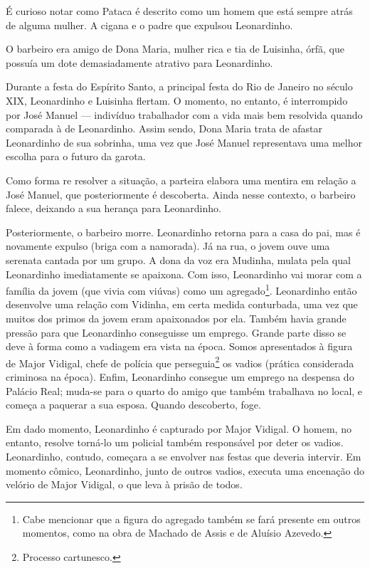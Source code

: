 É curioso notar como Pataca é descrito como um homem que está sempre atrás de alguma mulher. A cigana e o padre que expulsou Leonardinho.

O barbeiro era amigo de Dona Maria, mulher rica e tia de Luisinha, órfã, que possuía um dote demasiadamente atrativo para Leonardinho.

Durante a festa do Espírito Santo, a principal festa do Rio de Janeiro no século XIX, Leonardinho e Luisinha flertam. O momento, no entanto, é interrompido por José Manuel — indivíduo trabalhador com a vida mais bem resolvida quando comparada à de Leonardinho. Assim sendo, Dona Maria trata de afastar Leonardinho de sua sobrinha, uma vez que José Manuel representava uma melhor escolha para o futuro da garota.

Como forma re resolver a situação, a parteira elabora uma mentira em relação a José Manuel, que posteriormente é descoberta. Ainda nesse contexto, o barbeiro falece, deixando a sua herança para Leonardinho.

Posteriormente, o barbeiro morre. Leonardinho retorna para a casa do pai, mas é novamente expulso (briga com a namorada). Já na rua, o jovem ouve uma serenata cantada por um grupo. A dona da voz era Mudinha, mulata pela qual Leonardinho imediatamente se apaixona. Com isso, Leonardinho vai morar com a família da jovem (que vivia com viúvas) como um agregado\footnote{Cabe mencionar que a figura do agregado também se fará presente em outros momentos, como na obra de Machado de Assis e de Aluísio Azevedo.}. Leonardinho então desenvolve uma relação com Vidinha, em certa medida conturbada, uma vez que muitos dos primos da jovem eram apaixonados por ela. Também havia grande pressão para que Leonardinho conseguisse um emprego. Grande parte disso se deve à forma como a vadiagem era vista na época. Somos apresentados à figura de Major Vidigal, chefe de polícia que perseguia\footnote{Processo cartunesco.} os vadios (prática considerada criminosa na época). Enfim, Leonardinho consegue um emprego na despensa do Palácio Real; muda-se para o quarto do amigo que também trabalhava no local, e começa a paquerar a sua esposa. Quando descoberto, foge.

Em dado momento, Leonardinho é capturado por Major Vidigal. O homem, no entanto, resolve torná-lo um policial também responsável por deter os vadios. Leonardinho, contudo, começara a se envolver nas festas que deveria intervir. Em momento cômico, Leonardinho, junto de outros vadios, executa uma encenação do velório de Major Vidigal, o que leva à prisão de todos.

